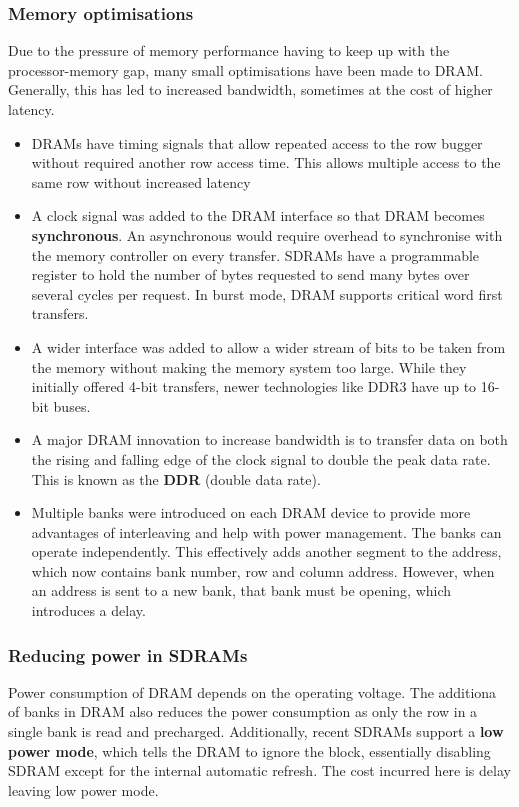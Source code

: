 \documentclass[11pt]{article}
\begin{document}
\subsubsection{Memory optimisations}
Due to the pressure of memory performance having to keep up with the processor-memory gap, many small optimisations have been made to DRAM. Generally, this has led to increased bandwidth, sometimes at the cost of higher latency.
\begin{itemize}
\item DRAMs have timing signals that allow repeated access to the row bugger without required another row access time. This allows multiple access to the same row without increased latency
\item A clock signal was added to the DRAM interface so that DRAM becomes \textbf{synchronous}. An asynchronous would require overhead to synchronise with the memory controller on every transfer. SDRAMs have a programmable register to hold the number of bytes requested to send many bytes over several cycles per request. In burst mode, DRAM supports critical word first transfers.
\item A wider interface was added to allow a wider stream of bits to be taken from the memory without making the memory system too large. While they initially offered 4-bit transfers, newer technologies like DDR3 have up to 16-bit buses.
\item A major DRAM innovation to increase bandwidth is to transfer data on both the rising and falling edge of the clock signal to double the peak data rate. This is known as the \textbf{DDR} (double data rate).
\item Multiple banks were introduced on each DRAM device to provide more advantages of interleaving and help with power management. The banks can operate independently. This effectively adds another segment to the address, which now contains bank number, row and column address. However, when an address is sent to a new bank, that bank must be opening, which introduces a delay.
\end{itemize}
\noindent

\subsubsection*{Reducing power in SDRAMs}
Power consumption of DRAM depends on the operating voltage. The additiona of banks in DRAM also reduces the power consumption as only the row in a single bank is read and precharged. Additionally, recent SDRAMs support a \textbf{low power mode}, which tells the DRAM to ignore the block, essentially disabling SDRAM except for the internal automatic refresh. The cost incurred here is delay leaving low power mode.
\end{document}
